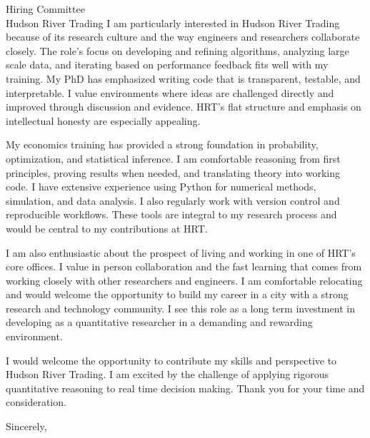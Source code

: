 \documentclass[11pt]{letter}
\begin{document}
\begin{letter}{Hiring Committee \\ Hudson River Trading}
I am particularly interested in Hudson River Trading because of its research culture and the way engineers and researchers collaborate closely. The role’s focus on developing and refining algorithms, analyzing large scale data, and iterating based on performance feedback fits well with my training. My PhD has emphasized writing code that is transparent, testable, and interpretable. I value environments where ideas are challenged directly and improved through discussion and evidence. HRT’s flat structure and emphasis on intellectual honesty are especially appealing.

My economics training has provided a strong foundation in probability, optimization, and statistical inference. I am comfortable reasoning from first principles, proving results when needed, and translating theory into working code. I have extensive experience using Python for numerical methods, simulation, and data analysis. I also regularly work with version control and reproducible workflows. These tools are integral to my research process and would be central to my contributions at HRT.

I am also enthusiastic about the prospect of living and working in one of HRT’s core offices. I value in person collaboration and the fast learning that comes from working closely with other researchers and engineers. I am comfortable relocating and would welcome the opportunity to build my career in a city with a strong research and technology community. I see this role as a long term investment in developing as a quantitative researcher in a demanding and rewarding environment.

I would welcome the opportunity to contribute my skills and perspective to Hudson River Trading. I am excited by the challenge of applying rigorous quantitative reasoning to real time decision making. Thank you for your time and consideration.

\closing{Sincerely,}

\end{letter}
\end{document}
